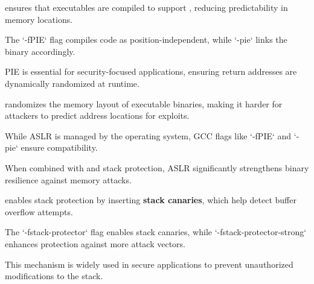 \begin{NxSSSSBox}
	\begin{NxIDBox}
		 ensures that executables are compiled to support , reducing predictability in memory locations.
	\end{NxIDBox}
	\begin{NxIDBox}
		The `-fPIE` flag compiles code as position-independent, while `-pie` links the binary accordingly.
	\end{NxIDBox}
	\begin{NxIDBox}
		PIE is essential for security-focused applications, ensuring return addresses are dynamically randomized at runtime.
	\end{NxIDBox}
\end{NxSSSSBox}

\begin{NxSSSSBox}
	\begin{NxIDBox}
		 randomizes the memory layout of executable binaries, making it harder for attackers to predict address locations for exploits.
	\end{NxIDBox}
	\begin{NxIDBox}
		While ASLR is managed by the operating system, GCC flags like `-fPIE` and `-pie` ensure compatibility.
	\end{NxIDBox}
	\begin{NxIDBox}
		When combined with  and stack protection, ASLR significantly strengthens binary resilience against memory attacks.
	\end{NxIDBox}
\end{NxSSSSBox}

\begin{NxSSSSBox}
	\begin{NxIDBox}
	 enables stack protection by inserting \textbf{stack canaries}, which help detect buffer overflow attempts.
	\end{NxIDBox}
	\begin{NxIDBox}
		The `-fstack-protector` flag enables stack canaries, while `-fstack-protector-strong` enhances protection against more attack vectors.
	\end{NxIDBox}
	\begin{NxIDBox}
		This mechanism is widely used in secure applications to prevent unauthorized modifications to the stack.
	\end{NxIDBox}
\end{NxSSSSBox}

